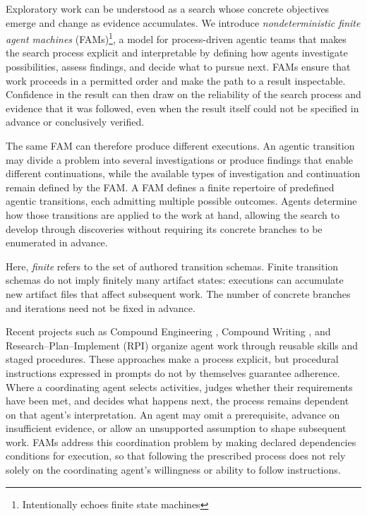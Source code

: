 \documentclass[letterpaper]{article}
\theoremstyle{definition}
\begin{document}
Exploratory work can be understood as a search whose concrete objectives emerge and change as evidence accumulates. We introduce \emph{nondeterministic finite agent machines} (FAMs)\footnote{Intentionally echoes finite state machines}, a model for process-driven agentic teams that makes the search process explicit and interpretable by defining how agents investigate possibilities, assess findings, and decide what to pursue next. FAMs ensure that work proceeds in a permitted order and make the path to a result inspectable. Confidence in the result can then draw on the reliability of the search process and evidence that it was followed, even when the result itself could not be specified in advance or conclusively verified.

The same FAM can therefore produce different executions. An agentic transition may divide a problem into several investigations or produce findings that enable different continuations, while the available types of investigation and continuation remain defined by the FAM. A FAM defines a finite repertoire of predefined agentic transitions, each admitting multiple possible outcomes. Agents determine how those transitions are applied to the work at hand, allowing the search to develop through discoveries without requiring its concrete branches to be enumerated in advance.

Here, \emph{finite} refers to the set of authored transition schemas. Finite transition schemas do not imply finitely many artifact states: executions can accumulate new artifact files that affect subsequent work. The number of concrete branches and iterations need not be fixed in advance.

Recent projects such as Compound Engineering \citep{everyCompoundEngineering}, Compound Writing \citep{everyCompoundWriting}, and Research--Plan--Implement (RPI) \citep{dex2025context} organize agent work through reusable skills and staged procedures. These approaches make a process explicit, but procedural instructions expressed in prompts do not by themselves guarantee adherence. Where a coordinating agent selects activities, judges whether their requirements have been met, and decides what happens next, the process remains dependent on that agent's interpretation. An agent may omit a prerequisite, advance on insufficient evidence, or allow an unsupported assumption to shape subsequent work. FAMs address this coordination problem by making declared dependencies conditions for execution, so that following the prescribed process does not rely solely on the coordinating agent's willingness or ability to follow instructions.
\end{document}
